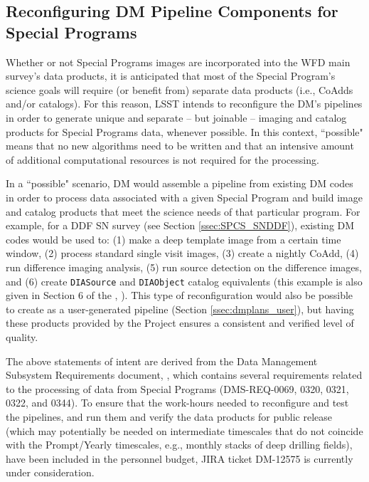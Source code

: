 \documentclass[DM,lsstdoc,toc]{lsstdoc}
\begin{document}
\subsection{Reconfiguring DM Pipeline Components for Special Programs}\label{ssec:dmplans_reconfig}

Whether or not Special Programs images are incorporated into the WFD main survey's data products, it is anticipated that most of the Special Program's science goals will require (or benefit from) separate data products (i.e., CoAdds and/or catalogs). For this reason, LSST intends to reconfigure the DM's pipelines in order to generate unique and separate -- but joinable -- imaging and catalog products for Special Programs data, whenever possible. In this context, ``possible" means that no new algorithms need to be written and that an intensive amount of additional computational resources is not required for the processing.

In a ``possible" scenario, DM would assemble a pipeline from existing DM codes in order to process data associated with a given Special Program and build image and catalog products that meet the science needs of that particular program. For example, for a DDF SN survey (see Section \ref{ssec:SPCS_SNDDF}), existing DM codes would be used to: (1) make a deep template image from a certain time window, (2) process standard single visit images, (3) create a nightly CoAdd, (4) run difference imaging analysis, (5) run source detection on the difference images, and (6) create \texttt{DIASource} and \texttt{DIAObject} catalog equivalents (this example is also given in Section 6 of the \DPDD, ). This type of reconfiguration would also be possible to create as a user-generated pipeline (Section \ref{ssec:dmplans_user}), but having these products provided by the Project ensures a consistent and verified level of quality. %

The above statements of intent are derived from the Data Management Subsystem Requirements document, , which contains several requirements related to the processing of data from Special Programs (DMS-REQ-0069, 0320, 0321, 0322, and 0344). To ensure that the work-hours needed to reconfigure and test the pipelines, and run them and verify the data products for public release (which may potentially be needed on intermediate timescales that do not coincide with the Prompt/Yearly timescales, e.g., monthly stacks of deep drilling fields), have been included in the personnel budget, JIRA ticket DM-12575 is currently under consideration. 
\end{document}
